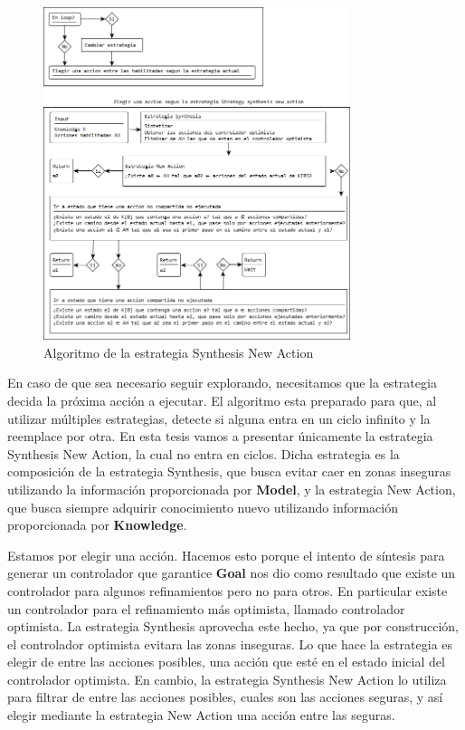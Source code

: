 \begin{figure}[H]
  \centering
    \includegraphics[width=0.8\textwidth]{Imagenes/Algoritmo/Algoritmo_elegir.png}
  \caption{Algoritmo de la estrategia Synthesis New Action}
  \label{fig:Algoritmo_elegir}
\end{figure}

En caso de que sea necesario seguir explorando, necesitamos que la estrategia decida la próxima acción a ejecutar. El algoritmo esta preparado para que,
al utilizar múltiples estrategias, detecte si alguna entra en un ciclo infinito y la reemplace por otra. En esta tesis vamos a presentar únicamente
la estrategia Synthesis New Action, la cual no entra en ciclos. Dicha estrategia es la composición de la estrategia Synthesis, que busca evitar caer
en zonas inseguras utilizando la información proporcionada por \textbf{Model}, y la estrategia New Action, que busca siempre adquirir conocimiento nuevo
utilizando información proporcionada por \textbf{Knowledge}.

\vspace{\baselineskip}
Estamos por elegir una acción. Hacemos esto porque el intento de síntesis para generar un controlador que garantice \textbf{Goal} nos dio como resultado que
existe un controlador para algunos refinamientos pero no para otros. En particular existe un controlador para el refinamiento más optimista, llamado
controlador optimista. La estrategia Synthesis aprovecha este hecho, ya que por construcción, el controlador optimista evitara las zonas inseguras. Lo que
hace la estrategia es elegir de entre las acciones posibles, una acción que esté en el estado inicial del controlador optimista. En cambio, la estrategia
Synthesis New Action lo utiliza para filtrar de entre las acciones posibles, cuales son las acciones seguras, y así elegir mediante la estrategia New Action
una acción entre las seguras.

